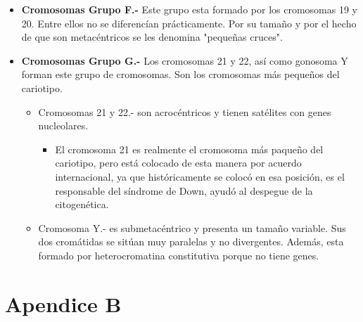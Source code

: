 \documentclass[12pt,letterpaper,titlepage]{article}
\begin{document}
\begin{itemize}
\begin{itemize}
\item  \textbf{Cromosomas Grupo F.-} Este grupo esta formado por los cromosomas 19 y 20. Entre ellos no se diferencían prácticamente. Por su tamaño y por el hecho de que son metacéntricos se les denomina "pequeñas cruces".
\item  \textbf{Cromosomas Grupo G.-} Los cromosomas 21 y 22, así como gonosoma Y forman este grupo de cromosomas. Son los cromosomas más pequeños del cariotipo.
\begin{itemize}\itemsep=0pt
\item  {Cromosomas 21 y 22.-} son acrocéntricos y tienen satélites con genes nucleolares. 
\begin{itemize}\itemsep=0pt
\item  El cromosoma 21 es realmente el cromosoma más paqueño del cariotipo, pero está colocado de esta manera por acuerdo internacional, ya que históricamente se colocó en esa posición, es el responsable del síndrome de Down, ayudó al despegue de la citogenética. 
\end{itemize}

\item  {Cromosoma Y.-} es submetacéntrico y presenta un tamaño variable. Sus dos cromátidas se sitúan muy paralelas y no divergentes. Además, esta formado por heterocromatina constitutiva porque no tiene genes. 
\end{itemize}

\end{itemize}


\end{itemize}
\newpage
\section{Apendice B}\label{apendiceb}


\end{document}
